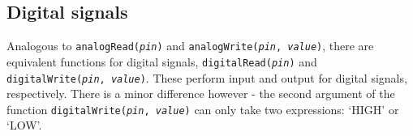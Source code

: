 \documentclass{article}
\begin{document}
\subsection{Digital signals}
Analogous to \texttt{analogRead(\textit{pin})} and \texttt{analogWrite(\textit{pin}, \textit{value})}, there are equivalent functions for digital signals, \texttt{digitalRead(\textit{pin})} and \texttt{digitalWrite(\textit{pin}, \textit{value})}. These perform input and output for digital signals, respectively. There is a minor difference however - the second argument of the function \texttt{digitalWrite(\textit{pin}, \textit{value})} can only take two expressions: `HIGH' or `LOW'.
\end{document}
